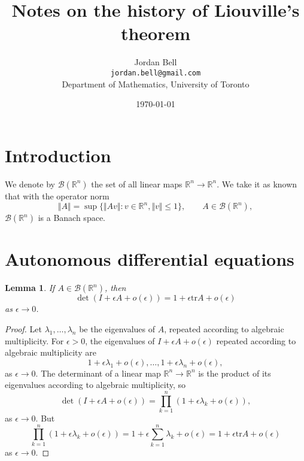 \documentclass{article}
\newcommand{\tr}{\textrm{tr}}
\newcommand{\norm}[1]{\Vert #1 \Vert}
\newtheorem{lemma}[theorem]{Lemma}
\begin{document}
\title{Notes on the history of Liouville's theorem}
\author{Jordan Bell\\ \texttt{jordan.bell@gmail.com}\\Department of Mathematics, University of Toronto}
\date{\today}

\maketitle

\section{Introduction}
We denote by $\mathscr{B}(\mathbb{R}^n)$ the set of all linear maps $\mathbb{R}^n \to \mathbb{R}^n$. We take it as known
that with the operator norm
\[
\norm{A} = \sup \{\norm{Av}: v\in \mathbb{R}^n, \norm{v} \leq 1\}, \qquad A \in \mathscr{B}(\mathbb{R}^n),
\]
$\mathscr{B}(\mathbb{R}^n)$ is a Banach space.


\section{Autonomous differential equations}
\begin{lemma}
If $A \in \mathscr{B}(\mathbb{R}^n)$, then 
\[
 \det (I+\epsilon A+o(\epsilon))=1+\epsilon \tr A +o(\epsilon)
\]
as $\epsilon \to 0$.
\label{detlemma}
\end{lemma}
\begin{proof}
Let $\lambda_1,\ldots,\lambda_n$ be the eigenvalues of $A$, repeated according
to algebraic multiplicity. For $\epsilon>0$, the eigenvalues of $I+\epsilon A+o(\epsilon)$  repeated according to algebraic multiplicity are
\[
1+\epsilon \lambda_1+o(\epsilon),\ldots,
1+\epsilon \lambda_n+o(\epsilon),
\]
as $\epsilon \to 0$. The determinant of a linear map $\mathbb{R}^n \to \mathbb{R}^n$ is the product of its eigenvalues according to algebraic
 multiplicity, so
 \[
 \det (I+\epsilon A+o(\epsilon)) = \prod_{k=1}^n (1+\epsilon \lambda_k+o(\epsilon)),
 \]
 as $\epsilon \to 0$.
 But
 \[
 \prod_{k=1}^n (1+\epsilon \lambda_k + o(\epsilon)) = 1 + \epsilon \sum_{k=1}^n \lambda_k +o(\epsilon) = 1+\epsilon \tr A +o(\epsilon)
 \]
 as $\epsilon \to 0$.
 \end{proof}
 
 
\end{document}
